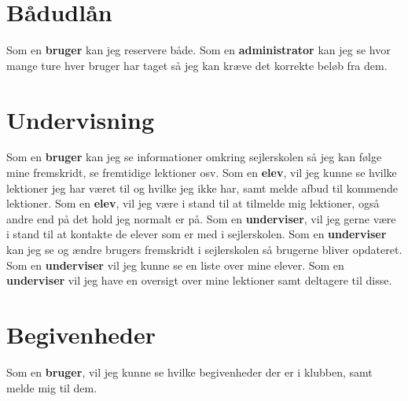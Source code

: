 \section{Bådudlån}

Som en \textbf{bruger} kan jeg reservere både.
\newline
Som en \textbf{administrator} kan jeg se hvor mange ture hver bruger har taget så jeg kan kræve det korrekte beløb fra dem.

\section{Undervisning}
Som en \textbf{bruger} kan jeg se informationer omkring sejlerskolen så jeg kan følge mine fremskridt, se fremtidige lektioner osv.
\newline
Som en \textbf{elev}, vil jeg kunne se hvilke lektioner jeg har været til og hvilke jeg ikke har, samt melde afbud til kommende lektioner.
\newline
Som en \textbf{elev}, vil jeg være i stand til at tilmelde mig lektioner, også andre end på det hold jeg normalt er på.
\newline
Som en \textbf{underviser}, vil jeg gerne være i stand til at kontakte de elever som er med i sejlerskolen.
\newline
Som en \textbf{underviser} kan jeg se og ændre brugers fremskridt i sejlerskolen så brugerne bliver opdateret.
\newline
Som en \textbf{underviser} vil jeg kunne se en liste over mine elever.
\newline
Som en \textbf{underviser} vil jeg have en oversigt over mine lektioner samt deltagere til disse.

\section{Begivenheder}
Som en \textbf{bruger}, vil jeg kunne se hvilke begivenheder der er i klubben, samt melde mig til dem.